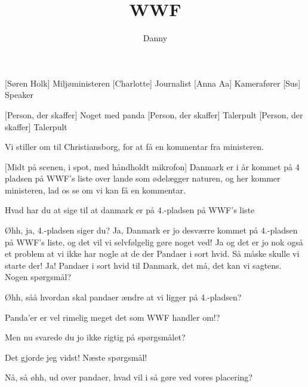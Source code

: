 \documentclass[a4paper,11pt]{article}
\title{WWF}
\author{Danny}
\begin{document}
\maketitle

\begin{roles}
    [Søren Holk] Miljøministeren
    [Charlotte] Journalist 
    [Anna Aa] Kamerafører
    [Sus] Speaker


\end{roles}

\begin{props}
    [Person, der skaffer] Noget med panda
    [Person, der skaffer] Talerpult
    [Person, der skaffer] Talerpult
\end{props}

\begin{sketch}


 Vi stiller om til Christiansborg, for at få en kommentar fra ministeren.


[Midt på scenen, i spot, med håndholdt mikrofon] Danmark er i år kommet på 4 pladsen på WWF's liste over lande som ødelægger naturen, og her kommer ministeren, lad os se om vi kan få en kommentar.


 Hvad har du at sige til at danmark er på 4.-pladsen på WWF's liste 

 Øhh, ja, 4.-pladsen siger du? Ja, Danmark er jo desværre kommet på 4.-pladsen på WWF's liste, og det vil vi selvfølgelig gøre noget ved! Ja og det er jo nok også et problem at vi ikke har nogle at de der Pandaer i sort hvid. Så måske skulle vi starte der! Ja! Pandaer i sort hvid til Danmark, det må, det kan vi sagtens. Nogen spørgsmål?

 Øhh, såå hvordan skal pandaer ændre at vi ligger på 4.-pladsen?

 Panda'er er vel rimelig meget det som WWF handler om!?

 Men nu svarede du jo ikke rigtig på spørgsmålet?

 Det gjorde jeg vidst! Næste spørgsmål!

 Nå, så øhh, ud over pandaer, hvad vil i så gøre ved vores placering?


\end{sketch}
\end{document}
